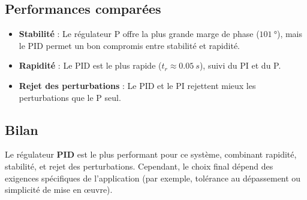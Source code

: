 \documentclass[11pt, a4paper]{article}
\begin{document}
\subsection{Performances comparées}
\begin{itemize}
    \item \textbf{Stabilité} : Le régulateur P offre la plus grande marge de phase ($\SI{101}{\degree}$), mais le PID permet un bon compromis entre stabilité et rapidité.
    \item \textbf{Rapidité} : Le PID est le plus rapide ($t_r \approx \SI{0.05}{s}$), suivi du PI et du P.
    \item \textbf{Rejet des perturbations} : Le PID et le PI rejettent mieux les perturbations que le P seul.
\end{itemize}

\subsection{Bilan}
Le régulateur \textbf{PID} est le plus performant pour ce système, combinant rapidité, stabilité, et rejet des perturbations. Cependant, le choix final dépend des exigences spécifiques de l'application (par exemple, tolérance au dépassement ou simplicité de mise en œuvre).
\end{document}
